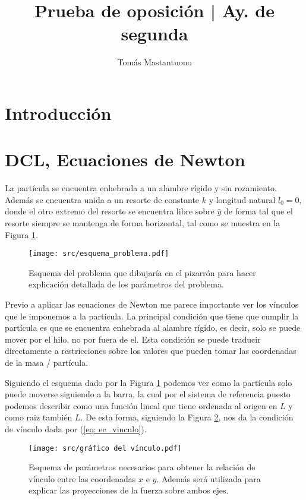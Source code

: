\documentclass{article}
\author{Tomás Mastantuono}
\begin{document}
\title{Prueba de oposición | Ay. de segunda}
\date{}
\maketitle

\begin{multicols}{2}
\section*{Introducción}
\label{introducción}

\section{DCL, Ecuaciones de Newton}
La partícula se encuentra enhebrada a un alambre rígido y sin rozamiento. Además se encuentra unida a un resorte de constante $k$ y longitud natural $l_0 = 0$, donde el otro extremo del resorte se encuentra libre sobre $\hat{y}$ de forma tal que el resorte siempre se mantenga de forma horizontal, tal como se muestra en la Figura \ref{fig: diagrama_problema}.

\begin{figure}[H]
    \centering
    \texttt{[image: src/esquema\_problema.pdf]}
    \caption{
        Esquema del problema que dibujaría en el pizarrón para hacer explicación detallada de los parámetros del problema.
    }
    \label{fig: diagrama_problema}
\end{figure}

Previo a aplicar las ecuaciones de Newton me parece importante ver los vínculos que le imponemos a la partícula. La principal condición que tiene que cumplir la partícula es que se encuentra enhebrada al alambre rígido, es decir, solo se puede mover por el hilo, no por fuera de el. Esta condición se puede traducir directamente a restricciones sobre los valores que pueden tomar las coordenadas de la masa / partícula.

Siguiendo el esquema dado por la Figura \ref{fig: diagrama_problema} podemos ver como la partícula solo puede moverse siguiendo a la barra, la cual por el sistema de referencia puesto podemos describir como una función lineal que tiene ordenada al origen en $L$ y como raiz también $L$. De esta forma, siguiendo la Figura \ref{fig: vinculo}, nos da la condición de vínculo dada por (\ref{eq: ec_vinculo}).

\begin{figure}[H]
    \centering
    \texttt{[image: src/gráfico del vínculo.pdf]}
    \captionsetup{aboveskip=0pt, belowskip=0pt}
    \caption{
        Esquema de parámetros necesarios para obtener la relación de vínculo entre las coordenadas $x$ e $y$. Además será utilizada para explicar las proyecciones de la fuerza sobre ambos ejes.
    }
    \label{fig: vinculo}
\end{figure}


\end{multicols}
\end{document}
